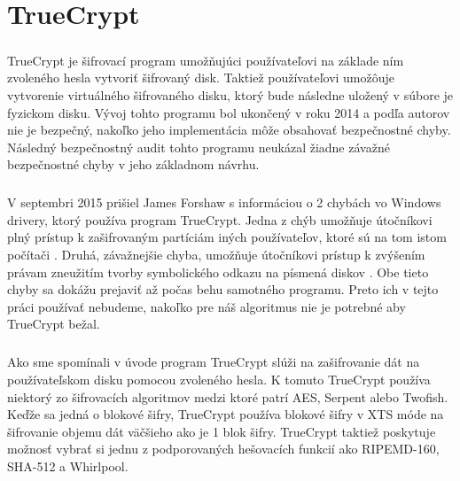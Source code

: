 \chapter{TrueCrypt}
\paragraph{}
TrueCrypt je šifrovací program umožňujúci používateľovi na základe ním zvoleného hesla vytvoriť šifrovaný disk. Taktiež používateľovi umožôuje vytvorenie virtuálného šifrovaného disku, ktorý bude následne uložený v súbore je fyzickom disku. Vývoj tohto programu bol ukončený v roku 2014 a podľa autorov nie je bezpečný, nakoľko jeho implementácia môže obsahovať bezpečnostné chyby. Následný bezpečnostný audit tohto programu neukázal žiadne závažné bezpečnostné chyby v jeho základnom návrhu. 

\paragraph{}
V septembri 2015 prišiel James Forshaw s informáciou o 2 chybách vo Windows drivery, ktorý používa program TrueCrypt. Jedna z chýb umožňuje útočníkovi plný prístup k zašifrovaným partíciám iných používateľov, ktoré sú na tom istom počítači \cite{issue1}. Druhá, závažnejšie chyba, umožňuje útočníkovi prístup k zvýšením právam zneužitím tvorby symbolického odkazu na písmená diskov \cite{issue2}. Obe tieto chyby sa dokážu prejaviť až počas behu samotného programu. Preto ich v tejto práci používať nebudeme, nakoľko pre náš algoritmus nie je potrebné aby TrueCrypt bežal.

\paragraph{}
Ako sme spomínali v úvode program TrueCrypt slúži na zašifrovanie dát na používateľskom disku pomocou zvoleného hesla. K tomuto TrueCrypt používa niektorý zo šifrovacích algoritmov medzi ktoré patrí AES, Serpent alebo Twofish. Keďže sa jedná o blokové šifry, TrueCrypt používa blokové šifry v XTS móde na šifrovanie objemu dát väčšieho ako je 1 blok šifry. TrueCrypt taktiež poskytuje možnosť vybrať si jednu z podporovaných hešovacích funkcií ako RIPEMD-160, SHA-512 a Whirlpool.

